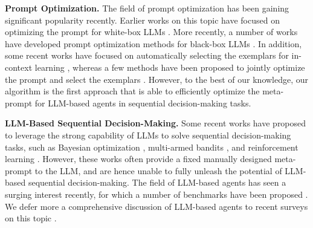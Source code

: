 \textbf{Prompt Optimization.}
The field of prompt optimization has been gaining significant popularity recently.
Earlier works on this topic have focused on optimizing the prompt for white-box LLMs \cite{Shin2020ElicitingKF,Shi2022TowardHR,lester2021power,Li2021PrefixTuningOC,zhong2021optiprompt,deng2022rlprompt}.
More recently, a number of works have developed prompt optimization methods for black-box LLMs \cite{chen2023instructzero,zhou2023large,fernando2023promptbreeder,guo2023connecting,hu2024localized,lin2023instinct,zhan2024unlocking,juneja2024task,wang2023promptagent,kong2024prewrite,schneider2024hyperband,shi2024best}.
In addition, some recent works have focused on automatically selecting the exemplars for in-context learning \cite{wang2023latent,chang2023data-model,li2023support-examples,zhang2022active,nguyen2023incontext,albalak2024survey-data-selection,ye2023compositional,liu2022makes,gao2024ambiguityaware,rubin2022retrieval,ye2023compositional,levy2023diverse,gupta2023coverage},
whereas a few methods have been proposed to jointly optimize the prompt and select the exemplars \cite{opsahl2024optimizing,wan2024teach,wu2024prompt}.
However, to the best of our knowledge, our algorithm is the first approach that is able to efficiently optimize the meta-prompt for LLM-based agents in sequential decision-making tasks.

\textbf{LLM-Based Sequential Decision-Making.}
Some recent works have proposed to leverage the strong capability of LLMs to solve sequential decision-making tasks, such as Bayesian optimization \cite{yang2023large}, multi-armed bandits \cite{krishnamurthy2024can,xia2024beyond,chen2024efficient,mukherjee2024pretraining}, and reinforcement learning \cite{dai2024context,monea2024llms,wang2024transformers}.
However, these works often provide a fixed manually designed meta-prompt to the LLM, and are hence unable to fully unleash the potential of LLM-based sequential decision-making.
The field of LLM-based agents has seen a surging interest recently, for which a number of benchmarks have been proposed \cite{liu2023agentbench,wu2023smartplay,xi2024agentgym}. We defer more a comprehensive discussion of LLM-based agents to recent surveys on this topic \cite{cheng2024exploring,wang2024survey,xi2023rise}.

